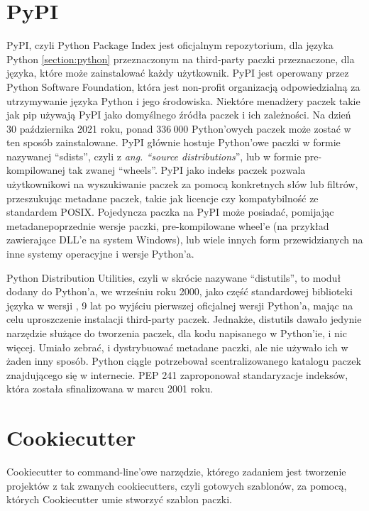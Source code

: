 \section{PyPI}
\label{section:pypi}
PyPI, \cite{PyPI} \cite{AdvancedPythonDevelopment} czyli Python Package Index jest oficjalnym repozytorium, dla języka Python \ref{section:python} przeznaczonym na third-party paczki przeznaczone, dla języka, które może zainstalować każdy użytkownik. PyPI jest operowany przez Python Software Foundation, która jest non-profit organizacją odpowiedzialną za utrzymywanie języka Python i jego  środowiska. Niektóre menadżery paczek takie jak pip \cite{Pip} używają PyPI jako domyślnego źródła paczek i ich zależności. Na dzień 30 października 2021 roku, ponad $336 \ 000$ Python'owych paczek może zostać w ten sposób zainstalowane. PyPI głównie hostuje Python'owe paczki w formie nazywanej ``sdists'', czyli z \textit{ang. ``source distributions}'', lub w formie pre-kompilowanej tak zwanej ``wheels''. PyPI jako indeks paczek pozwala użytkownikowi na wyszukiwanie paczek za pomocą konkretnych słów lub filtrów, przeszukując metadane paczek, takie jak licencje czy kompatybilność ze standardem POSIX. Pojedyncza paczka na PyPI może posiadać, pomijając metadanepoprzednie wersje paczki, pre-kompilowane wheel'e (na przykład zawierające DLL'e na system Windows), lub wiele innych form przewidzianych na inne systemy operacyjne i wersje Python'a.

Python Distribution Utilities, czyli w skrócie nazywane ``distutils'', to moduł dodany do Python'a, we wrześniu roku 2000, jako część standardowej biblioteki języka w wersji , 9 lat po wyjściu pierwszej oficjalnej wersji Python'a, mając na celu uproszczenie instalacji third-party paczek.
Jednakże, distutils dawało jedynie narzędzie służące do tworzenia paczek, dla kodu napisanego w Python'ie, i nic więcej. Umiało zebrać, i dystrybuować metadane paczki, ale nie używało ich w żaden inny sposób. Python ciągle potrzebował scentralizowanego katalogu paczek znajdującego się w internecie. PEP 241 \cite{PEP241} zaproponował standaryzacje indeksów, która została sfinalizowana w marcu 2001 roku.


\clearpage

\section{Cookiecutter}
\label{section:cookiecutter}
Cookiecutter \cite{CookieCutterDocumentation} \cite{CookiecutterGitHub} to command-line'owe narzędzie, którego zadaniem jest tworzenie projektów z tak zwanych cookiecutters, czyli gotowych szablonów, za pomocą, których Cookiecutter umie stworzyć szablon paczki.

